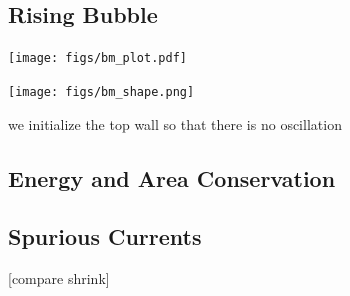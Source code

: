 \documentclass{jfm}
\begin{document}
\subsection {Rising Bubble}
    \begin{center}
        \texttt{[image: figs/bm\_plot.pdf]}
    \end{center}
    \begin{center}
        \texttt{[image: figs/bm\_shape.png]}
    \end{center}
    we initialize the top wall so that there is no oscillation
\subsection {Energy and Area Conservation}
\subsection {Spurious Currents}
    [compare shrink]
\end{document}
